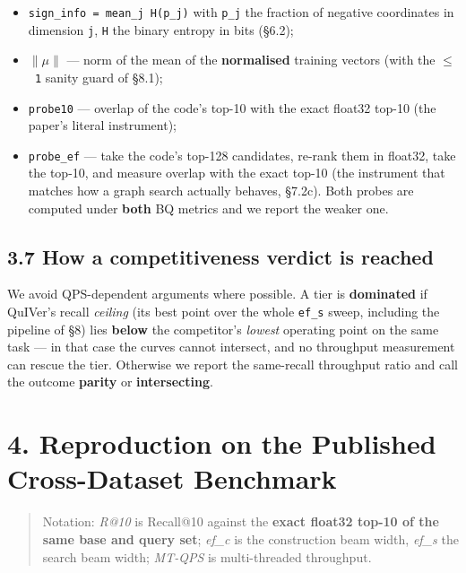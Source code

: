 \documentclass[
  10pt,
]{article}
\providecommand{\tightlist}{%
  \setlength{\itemsep}{0pt}\setlength{\parskip}{0pt}}
\begin{document}
\begin{itemize}
\tightlist
\item
  \texttt{sign\_info\ =\ mean\_j\ H(p\_j)} with \texttt{p\_j} the
  fraction of negative coordinates in dimension \texttt{j}, \texttt{H}
  the binary entropy in bits (§6.2);
\item
  \texttt{$\|$$\mu$$\|$} --- norm of the mean of the \textbf{normalised} training
  vectors (with the \texttt{$\leq$\ 1} sanity guard of §8.1);
\item
  \texttt{probe10} --- overlap of the code's top-10 with the exact
  float32 top-10 (the paper's literal instrument);
\item
  \texttt{probe\_ef} --- take the code's top-128 candidates, re-rank
  them in float32, take the top-10, and measure overlap with the exact
  top-10 (the instrument that matches how a graph search actually
  behaves, §7.2c). Both probes are computed under \textbf{both} BQ
  metrics and we report the weaker one.
\end{itemize}

\subsection{3.7 How a competitiveness verdict is
reached}\label{how-a-competitiveness-verdict-is-reached}

We avoid QPS-dependent arguments where possible. A tier is
\textbf{dominated} if QuIVer's recall \emph{ceiling} (its best point
over the whole \texttt{ef\_s} sweep, including the pipeline of §8) lies
\textbf{below} the competitor's \emph{lowest} operating point on the
same task --- in that case the curves cannot intersect, and no
throughput measurement can rescue the tier. Otherwise we report the
same-recall throughput ratio and call the outcome \textbf{parity} or
\textbf{intersecting}.

\section{4. Reproduction on the Published Cross-Dataset
Benchmark}\label{reproduction-on-the-published-cross-dataset-benchmark}

\begin{quote}
Notation: \emph{R@10} is Recall@10 against the \textbf{exact float32
top-10 of the same base and query set}; \emph{ef\_c} is the construction
beam width, \emph{ef\_s} the search beam width; \emph{MT-QPS} is
multi-threaded throughput.
\end{quote}
\end{document}
